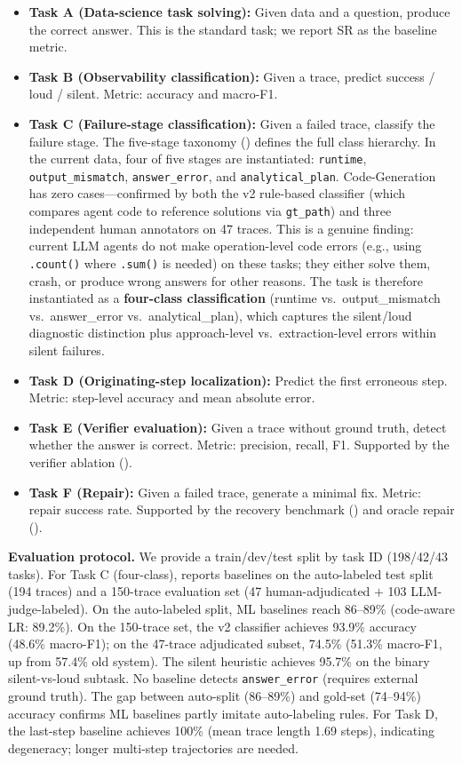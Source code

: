 \begin{itemize}[leftmargin=*,itemsep=1pt]
\item \textbf{Task A (Data-science task solving):} Given data and a question, produce the correct answer. This is the standard task; we report SR as the baseline metric.
\item \textbf{Task B (Observability classification):} Given a trace, predict success / loud / silent. Metric: accuracy and macro-F1.
\item \textbf{Task C (Failure-stage classification):} Given a failed trace, classify the failure stage. The five-stage taxonomy () defines the full class hierarchy. In the current data, four of five stages are instantiated: \texttt{runtime}, \texttt{output\_mismatch}, \texttt{answer\_error}, and \texttt{analytical\_plan}. Code-Generation has zero cases---confirmed by both the v2 rule-based classifier (which compares agent code to reference solutions via \texttt{gt\_path}) and three independent human annotators on 47 traces. This is a genuine finding: current LLM agents do not make operation-level code errors (e.g., using \texttt{.count()} where \texttt{.sum()} is needed) on these tasks; they either solve them, crash, or produce wrong answers for other reasons. The task is therefore instantiated as a \textbf{four-class classification} (runtime vs.\ output\_mismatch vs.\ answer\_error vs.\ analytical\_plan), which captures the silent/loud diagnostic distinction plus approach-level vs.\ extraction-level errors within silent failures.
\item \textbf{Task D (Originating-step localization):} Predict the first erroneous step. Metric: step-level accuracy and mean absolute error.
\item \textbf{Task E (Verifier evaluation):} Given a trace without ground truth, detect whether the answer is correct. Metric: precision, recall, F1. Supported by the verifier ablation ().
\item \textbf{Task F (Repair):} Given a failed trace, generate a minimal fix. Metric: repair success rate. Supported by the recovery benchmark () and oracle repair ().
\end{itemize}

\textbf{Evaluation protocol.} We provide a train/dev/test split by task ID (198/42/43 tasks). For Task C (four-class),  reports baselines on the auto-labeled test split (194 traces) and a 150-trace evaluation set (47 human-adjudicated $+$ 103 LLM-judge-labeled). On the auto-labeled split, ML baselines reach 86--89\% (code-aware LR: 89.2\%). On the 150-trace set, the v2 classifier achieves 93.9\% accuracy (48.6\% macro-F1); on the 47-trace adjudicated subset, 74.5\% (51.3\% macro-F1, up from 57.4\% old system). The silent heuristic achieves 95.7\% on the binary silent-vs-loud subtask. No baseline detects \texttt{answer\_error} (requires external ground truth). The gap between auto-split (86--89\%) and gold-set (74--94\%) accuracy confirms ML baselines partly imitate auto-labeling rules. For Task D, the last-step baseline achieves 100\% (mean trace length 1.69 steps), indicating degeneracy; longer multi-step trajectories are needed.



\FloatBarrier
